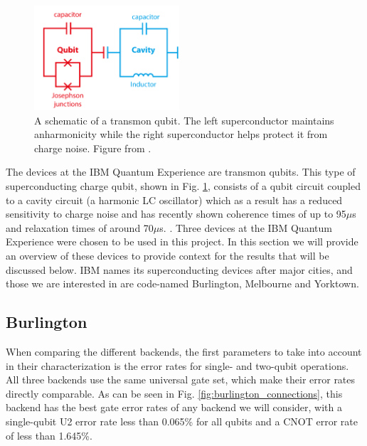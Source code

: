 \begin{figure}[h]
  \includegraphics[width=0.48\textwidth]{images/transmon_diagram.png}
  \caption{A schematic of a transmon qubit. The left superconductor maintains
    anharmonicity while the right superconductor helps protect it from charge
    noise. Figure from \cite{dickel20_how_to_make_artif_atoms}.}
  \label{fig:transmon}
\end{figure}

The devices at the IBM Quantum Experience are transmon qubits. This type of
superconducting charge qubit, shown in Fig. \ref{fig:transmon}, consists of a qubit
circuit coupled to a cavity circuit (a harmonic LC oscillator) which as a result
has a reduced sensitivity to
charge noise and has recently shown coherence times of up to 95$\mu$s and
relaxation times of around 70$\mu$s.
\cite{rigetti12_super_qubit_waveg_cavit_with}. Three devices at the IBM Quantum
Experience were chosen to be used in this project. In this section we will
provide an overview of these devices to provide context for the results that
will be discussed below. IBM names its superconducting devices after major
cities, and those we are interested in are code-named Burlington, Melbourne and
Yorktown.

\subsection{Burlington}
When comparing the different backends, the first parameters to take into account
in their characterization is the error rates for single- and two-qubit
operations. All three backends use the same universal gate set, which make their
error rates directly comparable. As can be seen in Fig.
\ref{fig:burlington_connections}, this backend has the best gate error rates of
any backend we will consider, with a single-qubit U2 error rate less than 0.065\%
for all qubits and a CNOT error rate of less than 1.645\%. 


